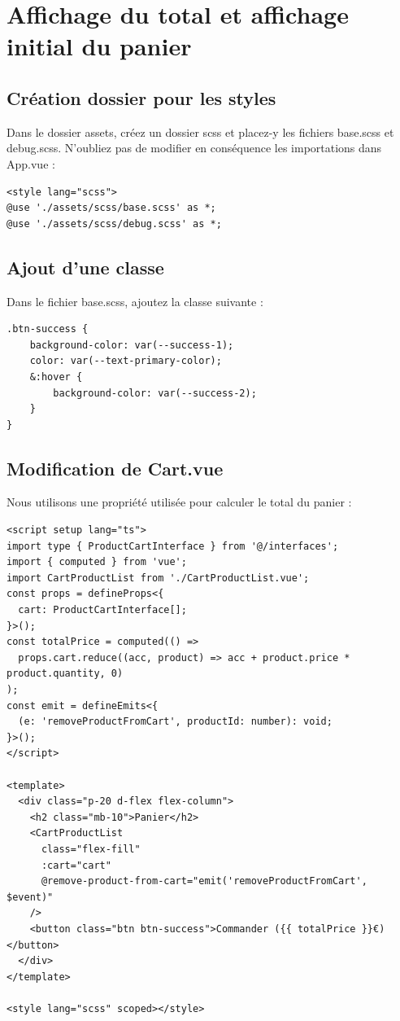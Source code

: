 \documentclass{article}
\begin{document}

\section{Affichage du total et affichage initial du panier}
\subsection{Création dossier pour les styles}
Dans le dossier {\color{monOrange}assets}, créez un dossier {\color{monOrange}scss} et placez-y les fichiers {\color{monOrange}base.scss} et {\color{monOrange}debug.scss}. N'oubliez pas de modifier en conséquence les importations dans {\color{monOrange}App.vue} :
\begin{verbatim}
<style lang="scss">
@use './assets/scss/base.scss' as *;
@use './assets/scss/debug.scss' as *;
\end{verbatim}

\subsection{Ajout d'une classe}
Dans le fichier {\color{monOrange}base.scss}, ajoutez la classe suivante :
\begin{verbatim}
.btn-success {
    background-color: var(--success-1);
    color: var(--text-primary-color);
    &:hover {
        background-color: var(--success-2);
    }
}
\end{verbatim}
\subsection{Modification de {\color{monOrange}Cart.vue}}
Nous utilisons une propriété utilisée pour calculer le total du panier :
\begin{verbatim}
<script setup lang="ts">
import type { ProductCartInterface } from '@/interfaces';
import { computed } from 'vue';
import CartProductList from './CartProductList.vue';
const props = defineProps<{
  cart: ProductCartInterface[];
}>();
const totalPrice = computed(() =>
  props.cart.reduce((acc, product) => acc + product.price * product.quantity, 0)
);
const emit = defineEmits<{
  (e: 'removeProductFromCart', productId: number): void;
}>();
</script>

<template>
  <div class="p-20 d-flex flex-column">
    <h2 class="mb-10">Panier</h2>
    <CartProductList
      class="flex-fill"
      :cart="cart"
      @remove-product-from-cart="emit('removeProductFromCart', $event)"
    />
    <button class="btn btn-success">Commander ({{ totalPrice }}€)</button>
  </div>
</template>

<style lang="scss" scoped></style>
\end{verbatim} 
\end{document}
